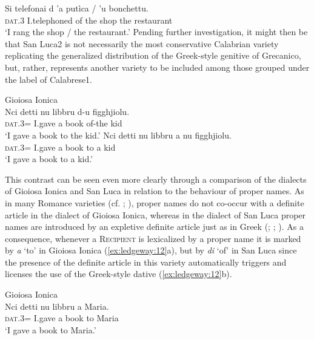 \documentclass[output=paper,modfonts,nonflat]{langsci/langscibook}
\begin{document}
{    \ex
    \gll Si  telefonai  d  ’a  putìca /  ’u  bonchettu.\\
    \textsc{dat}.3  I.telephoned  of  the  shop  the  restaurant\\
    \glt `I rang the shop / the restaurant.'
    \z
    \z
    Pending further investigation, it might then be that San Luca2 is not necessarily the most conservative Calabrian variety replicating the generalized distribution of the Greek-style genitive of Grecanico, but, rather, represents another variety to be included among those grouped under the label of Calabrese1.
}

\ea\label{ex:ledgeway:11}
  Gioiosa Ionica\\
\ea
	\gll Nci  detti  nu  libbru  d-u  figghjiolu.\\
        \textsc{dat}.3=  I.gave   a  book  of-the   kid  \\
        \glt `I gave a book to the kid.'
\ex
	\gll Nci  detti  nu  libbru  a  nu  figghjiolu.\\
        \textsc{dat}.3=  I.gave   a  book  to  a   kid  \\
        \glt `I gave a book to a kid.'
        \z
        \z

This contrast can be seen even more clearly through a comparison of the dialects of Gioiosa Ionica and San Luca in relation to the behaviour of proper names. As in many Romance varieties (cf. \citealt[103-104]{Ledgeway2012}; \citealt[111-112]{Ledgeway2015}), proper names do not co-occur with a definite article in the dialect of Gioiosa Ionica, whereas in the dialect of San Luca proper names are introduced by an expletive definite article just as in Greek (\citealt[198]{Mackridge1985}; \citealt[276-278]{Holton1997}; \citealt[208-209]{Ledgeway2013}). As a consequence, whenever a \textsc{Recipient} is lexicalized by a proper name it is marked by \textit{a} ‘to’ in Gioiosa Ionica (\ref{ex:ledgeway:12}a), but by \textit{di} ‘of’ in San Luca since the presence of the definite article in this variety automatically triggers and licenses the use of the Greek-style dative (\ref{ex:ledgeway:12}b).

\ea\label{ex:ledgeway:12}

  \ea  Gioiosa Ionica\\
 \gll Nci      detti   nu   libbru    a   Maria.\\
               \textsc{dat}.3=  I.gave  a  book  to   Maria\\
               \glt `I gave a book to Maria.'
               
\end{document}
